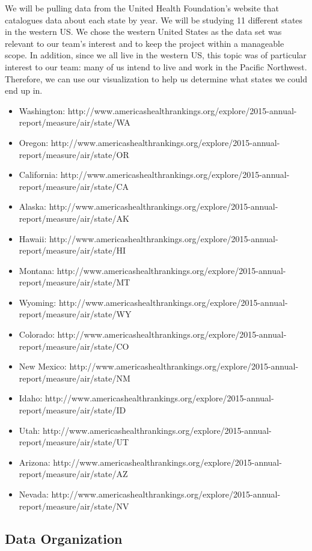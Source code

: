 \documentclass[journal]{vgtc}                %
\begin{document}
We will be pulling data from the United Health Foundation’s website that catalogues data about each state by year. We 
will be studying 11 different states in the western US. We chose the western United States as the data set was 
relevant to our team's interest and to keep the project within a manageable scope. In addition, since we all live in the
western US, this topic was of particular interest to our team: many of us intend to live and work in the Pacific 
Northwest. Therefore, we can use our visualization to help us determine what states we could end up in.
\begin{itemize}
\item Washington: 
http://www.americashealthrankings.org/explore/2015-annual-report/measure/air/state/WA
\item Oregon: http://www.americashealthrankings.org/explore/2015-annual-report/measure/air/state/OR
\item California: http://www.americashealthrankings.org/explore/2015-annual-report/measure/air/state/CA
\item Alaska: http://www.americashealthrankings.org/explore/2015-annual-report/measure/air/state/AK 
\item Hawaii: http://www.americashealthrankings.org/explore/2015-annual-report/measure/air/state/HI
\item Montana: http://www.americashealthrankings.org/explore/2015-annual-report/measure/air/state/MT
\item Wyoming: http://www.americashealthrankings.org/explore/2015-annual-report/measure/air/state/WY
\item Colorado: http://www.americashealthrankings.org/explore/2015-annual-report/measure/air/state/CO
\item New Mexico: http://www.americashealthrankings.org/explore/2015-annual-report/measure/air/state/NM
\item Idaho: http://www.americashealthrankings.org/explore/2015-annual-report/measure/air/state/ID
\item Utah: http://www.americashealthrankings.org/explore/2015-annual-report/measure/air/state/UT
\item Arizona: http://www.americashealthrankings.org/explore/2015-annual-report/measure/air/state/AZ
\item Nevada: http://www.americashealthrankings.org/explore/2015-annual-report/measure/air/state/NV 
\end{itemize}


\subsection{Data Organization}
\end{document}
